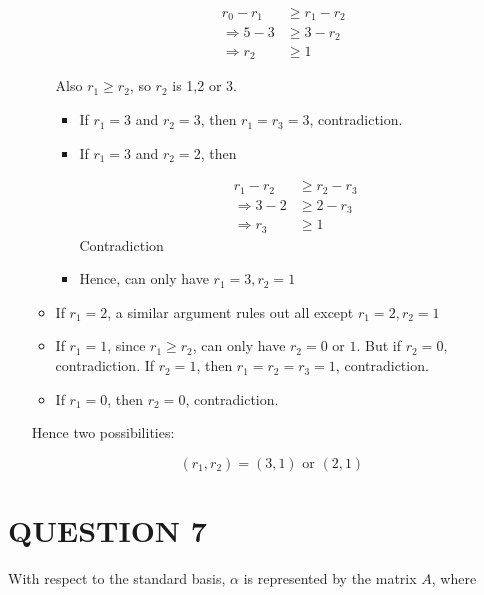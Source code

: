 \documentclass[a4paper]{article}
\begin{document}
\begin{enumerate}
\begin{itemize}
	\begin{align*}
	r_{0} - r_{1} & \geq r_{1} - r_{2}  \\
	\Rightarrow  5 - 3 & \geq 3 - r_{2} \\
	\Rightarrow r_{2} & \geq 1
	\end{align*}
	
	Also $ r_{1} \geq r_{2} $, so $ r_{2} $ is 1,2 or 3.
	
	\begin{itemize}
		\item If $ r_{1} = 3 $ and $ r_{2} = 3 $, then $ r_{1} = r_{3} = 3 $, contradiction.
		\item If $ r_{1} = 3 $ and $ r_{2} = 2 $, then 
		
		\begin{align*}
		r_{1} - r_{2} & \geq r_{2} - r_{3}  \\
		\Rightarrow  3 - 2 & \geq 2 - r_{3} \\
		\Rightarrow r_{3} & \geq 1
		\end{align*} Contradiction
		
		\item Hence, can only have $ r_{1} = 3, r_{2} = 1 $
		
		
	\end{itemize}
	
	
	\item If $ r_{1} = 2 $, a similar argument rules out all except $ r_{1} = 2,  r_{2} = 1$


	\item If $ r_{1} = 1 $, since $ r_{1} \geq r_{2} $, can only have $ r_{2} = 0$ or $ 1 $. But if $ r_{2} = 0$, contradiction. If $ r_{2} = 1 $, then $ r_{1} = r_{2} = r_{3} = 1 $, contradiction.
	
	\item If $ r_{1} = 0 $, then $ r_{2} = 0  $, contradiction.  	
\end{itemize}
	
	
	Hence two possibilities:
	
	\[ (r_{1},r_{2}) = (3,1) \text{ or } (2,1) \]
	
\end{enumerate}





\section{QUESTION 7}

With respect to the standard basis, $ \alpha $ is represented by the matrix $ A $, where
\end{document}
